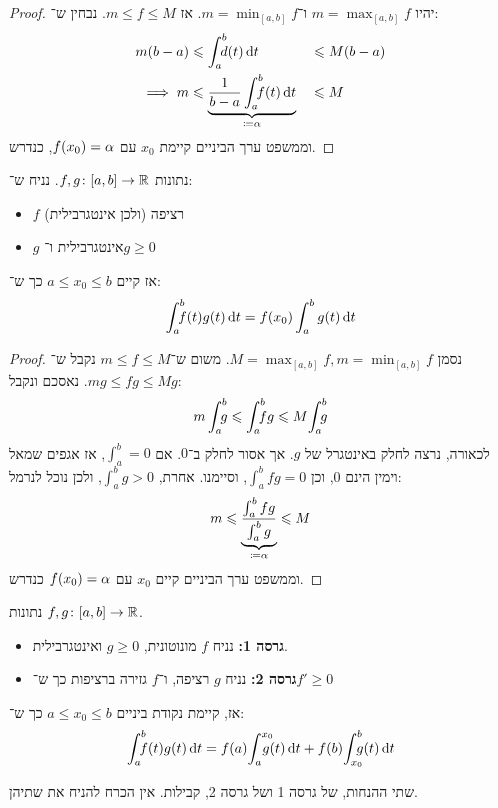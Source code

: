 \documentclass[name=רשימות חדו''א 2א]{../../../tex/classes/noChapterMegasumPreamble}
\begin{document}
	\begin{proof}
		יהיו $m = \max_{[a, b]} f$ ו־$m = \min_{[a, b]} f$. אז $m \le f \le M$. נבחין ש־:
		\begin{alignat*}{9}
			m(b - a) &\le \int^{b}_a \dequad \ d(t) \dt &&\le M(b - a) \\
			\implies m &\le \underbrace{\frac{1}{b - a} \int^{b}_a \dequad \ f(t) \dt}_{\cod \ag} &&\le M
		\end{alignat*}
		וממשפט ערך הביניים קיימת $x_0$ עם $f(x_0) = \alpha$, כנדרש.
	\end{proof}

	\begin{Theorem}
		נתונות $f, g \colon [a, b] \to \mathbb{R}$. נניח ש־:
		\begin{itemize}
			\item $f$ רציפה (ולכן אינטגרבילית)
			\item $g$ אינטגרבילית ו־$g \ge 0$
		\end{itemize}
		אז קיים $a \le x_0 \le b$ כך ש־:
		\[ \int^b_a \!\!\!\!\!\! \ f(t)g(t) \,\mathrm{d}t = f(x_0)\int^{b}_a g(t) \,\mathrm{d}t \]
	\end{Theorem}
	\begin{proof}
		נסמן $M = \max_{[a, b]} f, m = \min_{[a, b]} f$. משום ש־$m \le f \le M$ נקבל ש־$mg \le fg \le Mg$. נאסכם ונקבל:
		\[ m\int^{b}_a \dequad \ g \le \int^{b}_a \dequad \ fg \le M\! \int^{b}_a \dequad \ g \]
		לכאורה, נרצה לחלק באינטגרל של $g$. אך אסור לחלק ב־$0$. אם $\int^b_a = 0$, אז אגפים שמאל וימין הינם $0$, וכן $\int^b_a fg = 0$, וסיימנו. אחרת, $\int^b_a g > 0$, ולכן נוכל לנרמל:
		\[ m \leqslant \underbrace{\frac{\int^b_a fg}{\int^b_a g}}_{\coloneqq \alpha} \leqslant M \]
		וממשפט ערך הביניים קיים $x_0$ עם $f(x_0) = \alpha$ כנדרש.
	\end{proof}

	\begin{Lemma}נתונות $f, g \colon [a, b] \to \mathbb{R}$.
		\begin{itemize}
			\item \textbf{גרסה 1: }נניח $f$ מונוטונית, $g \ge 0$ ואינטגרבילית.
			\item \textbf{גרסה 2: }נניח $g$ רציפה, ו־$f$ גזירה ברציפות כך ש־$f' \ge 0$
		\end{itemize}
		אז, קיימת נקודת ביניים $a \le x_0 \le b$ כך ש־:
		\[ \int^b_a \dequad \ f(t)g(t) \dt = f(a)\! \int^{x_0}_a \dequad g(t) \dt + f(b)\! \int^{b}_{x_0}\dequad \ g(t) \dt \]
	\end{Lemma}
	שתי ההנחות, של גרסה 1 ושל גרסה 2, קבילות. אין הכרח להניח את שתיהן.
\end{document}
